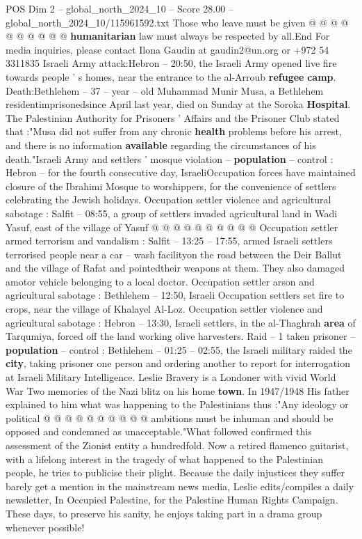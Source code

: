 \begin{textsample}{POS Dim 2 – global\_north\_2024\_10 – Score 28.00 – global\_north\_2024\_10/115961592.txt}
Those who leave must be given @ @ @ @ @ @ @ @ @ @ \textbf{humanitarian} law must always be respected by all.End For media inquiries, please contact Ilona Gaudin at gaudin2@un.org or +972 54 3311835 Israeli Army attack:Hebron -- 20:50, the Israeli Army opened live fire towards people ' s homes, near the entrance to the al-Arroub \textbf{refugee} \textbf{camp}.
Death:Bethlehem -- 37 -- year -- old Muhammad Munir Musa, a Bethlehem residentimprisonedsince April last year, died on Sunday at the Soroka \textbf{Hospital}.
The Palestinian Authority for Prisoners ' Affairs and the Prisoner Club stated that :"Musa did not suffer from any chronic \textbf{health} problems before his arrest, and there is no information \textbf{available} regarding the circumstances of his death."Israeli Army and settlers ' mosque violation -- \textbf{population} -- control : Hebron -- for the fourth consecutive day, IsraeliOccupation forces have maintained closure of the Ibrahimi Mosque to worshippers, for the convenience of settlers celebrating the Jewish holidays.
Occupation settler violence and agricultural sabotage : Salfit -- 08:55, a group of settlers invaded agricultural land in Wadi Yasuf, east of the village of Yasuf @ @ @ @ @ @ @ @ @ @ Occupation settler armed terrorism and vandalism : Salfit -- 13:25 -- 17:55, armed Israeli settlers terrorised people near a car -- wash facilityon the road between the Deir Ballut and the village of Rafat and pointedtheir weapons at them.
They also damaged amotor vehicle belonging to a local doctor.
Occupation settler arson and agricultural sabotage : Bethlehem -- 12:50, Israeli Occupation settlers set fire to crops, near the village of Khalayel Al-Loz.
Occupation settler violence and agricultural sabotage : Hebron -- 13:30, Israeli settlers, in the al-Thaghrah \textbf{area} of Tarqumiya, forced off the land working olive harvesters.
Raid -- 1 taken prisoner -- \textbf{population} -- control : Bethlehem -- 01:25 -- 02:55, the Israeli military raided the \textbf{city}, taking prisoner one person and ordering another to report for interrogation at Israeli Military Intelligence.
Leslie Bravery is a Londoner with vivid World War Two memories of the Nazi blitz on his home \textbf{town}.
In 1947/1948 His father explained to him what was happening to the Palestinians thus :"Any ideology or political @ @ @ @ @ @ @ @ @ @ ambitions must be inhuman and should be opposed and condemned as unacceptable."What followed confirmed this assessment of the Zionist entity a hundredfold.
Now a retired flamenco guitarist, with a lifelong interest in the tragedy of what happened to the Palestinian people, he tries to publicise their plight.
Because the daily injustices they suffer barely get a mention in the mainstream news media, Leslie edits/compiles a daily newsletter, In Occupied Palestine, for the Palestine Human Rights Campaign.
These days, to preserve his sanity, he enjoys taking part in a drama group whenever possible!

\end{textsample}
